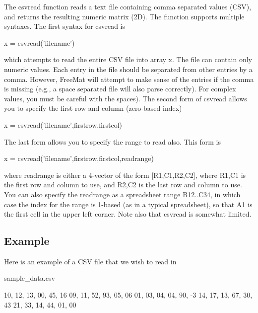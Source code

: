The {\ttfamily csvread} function reads a text file containing comma separated values (C\-S\-V), and returns the resulting numeric matrix (2\-D). The function supports multiple syntaxes. The first syntax for {\ttfamily csvread} is \begin{DoxyVerb}   x = csvread('filename')
\end{DoxyVerb}
 which attempts to read the entire C\-S\-V file into array {\ttfamily x}. The file can contain only numeric values. Each entry in the file should be separated from other entries by a comma. However, Free\-Mat will attempt to make sense of the entries if the comma is missing (e.\-g., a space separated file will also parse correctly). For complex values, you must be careful with the spaces). The second form of {\ttfamily csvread} allows you to specify the first row and column (zero-\/based index) \begin{DoxyVerb}  x = csvread('filename',firstrow,firstcol)
\end{DoxyVerb}
 The last form allows you to specify the range to read also. This form is \begin{DoxyVerb}  x = csvread('filename',firstrow,firstcol,readrange)
\end{DoxyVerb}
 where {\ttfamily readrange} is either a 4-\/vector of the form {\ttfamily \mbox{[}R1,C1,R2,C2\mbox{]}}, where {\ttfamily R1,C1} is the first row and column to use, and {\ttfamily R2,C2} is the last row and column to use. You can also specify the {\ttfamily readrange} as a spreadsheet range {\ttfamily B12..C34}, in which case the index for the range is 1-\/based (as in a typical spreadsheet), so that {\ttfamily A1} is the first cell in the upper left corner. Note also that {\ttfamily csvread} is somewhat limited. \hypertarget{variables_struct_Example}{}\subsection{Example}\label{variables_struct_Example}
Here is an example of a C\-S\-V file that we wish to read in

\begin{DoxyVerb}     sample_data.csv
\end{DoxyVerb}



\begin{DoxyVerbInclude}
10, 12, 13, 00, 45, 16
09, 11, 52, 93, 05, 06
01, 03, 04, 04, 90, -3
14, 17, 13, 67, 30, 43
21, 33, 14, 44, 01, 00
\end{DoxyVerbInclude}


